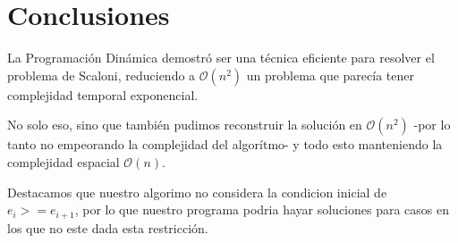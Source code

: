 \section{Conclusiones}

La Programaci\'on Din\'amica demostr\'o ser una t\'ecnica eficiente para resolver el problema de Scaloni,
reduciendo a $\mathcal{O}(n^2)$ un problema que parec\'ia tener complejidad temporal exponencial.

No solo eso, sino que tambi\'en pudimos reconstruir la soluci\'on en $\mathcal{O}(n^2)$
-por lo tanto no empeorando la complejidad del algor\'itmo- y todo esto manteniendo la complejidad espacial $\mathcal{O}(n)$.

Destacamos que nuestro algorimo no considera la condicion inicial de $e_i >= e_{i+1}$, por lo que nuestro programa podria hayar soluciones para casos en los que no este dada esta restricci\'on.
